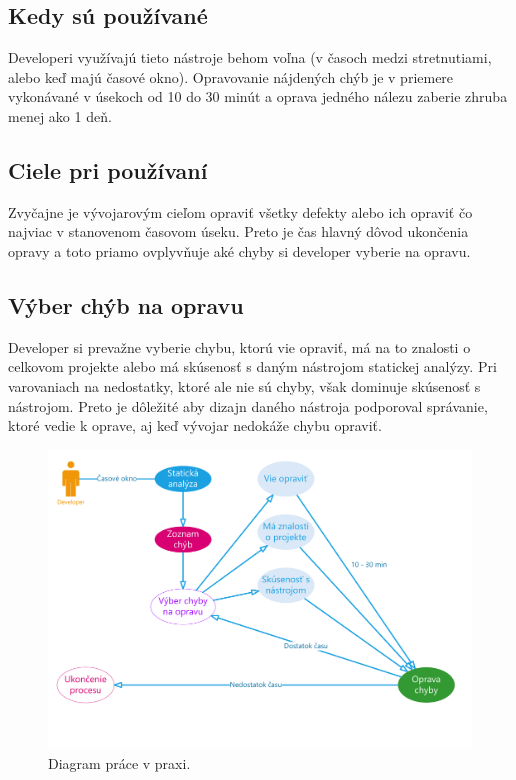 \documentclass[10pt,twoside,slovak,a4paper]{article}
\begin{document}
\subsection*{Kedy sú používané}
Developeri využívajú tieto nástroje behom voľna (v časoch medzi stretnutiami, alebo keď majú časové okno). Opravovanie
nájdených chýb je v priemere vykonávané v úsekoch od 10 do 30 minút a oprava jedného nálezu zaberie zhruba menej ako 1 deň.

\subsection*{Ciele pri používaní}
Zvyčajne je vývojarovým cieľom opraviť všetky defekty alebo ich opraviť čo najviac v stanovenom časovom úseku. Preto
je čas hlavný dôvod ukončenia opravy a toto priamo ovplyvňuje aké chyby si developer vyberie na opravu.

\subsection*{Výber chýb na opravu}
Developer si prevažne vyberie chybu, ktorú vie opraviť, má na to znalosti o celkovom projekte alebo má skúsenosť s
daným nástrojom statickej analýzy. Pri varovaniach na nedostatky, ktoré ale nie sú chyby, však dominuje skúsenosť
s nástrojom. Preto je dôležité aby dizajn daného nástroja podporoval správanie, ktoré vedie k oprave, aj keď vývojar
nedokáže chybu opraviť.



\begin{figure}[tbh]
	\centering
	\includegraphics[scale=0.50]{vyuzitie.pdf}
	\caption{Diagram práce v praxi.}
	\label{diagram}
\end{figure}
\end{document}
